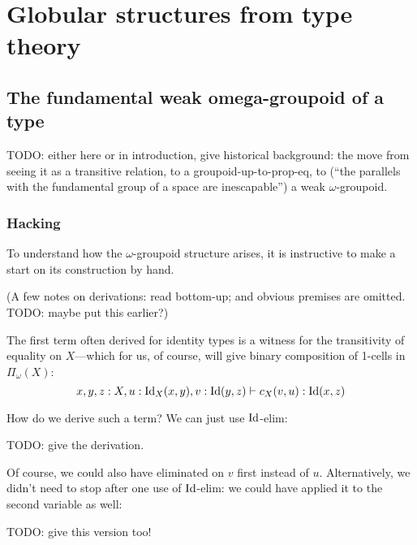 
\chapter{Globular structures from type theory}



\section{The fundamental weak omega-groupoid of a type}


TODO: either here or in introduction, give historical background: the move from seeing it as a transitive relation, to a groupoid-up-to-prop-eq, to (``the parallels with the fundamental group of a space are inescapable'') a weak $\omega$-groupoid.

\subsection*{Hacking} \label{sec:hacking} To understand how the $\omega$-groupoid structure arises, it is instructive to make a start on its construction by hand.

(A few notes on derivations: read bottom-up; and obvious premises are omitted.  TODO: maybe put this earlier?)

The first term often derived for identity types is a witness for the transitivity of equality on $X$---which for us, of course, will give binary composition of 1-cells in $\Pi_\omega(X)$:
$$ x,y,z:X, u:\mathrm{Id}_X(x,y), v:\mathrm{Id}(y,z) \vdash c_X(v,u) : \mathrm{Id}(x,z)$$

How do we derive such a term?  We can just use $\mathrm{Id}$-elim:

TODO: give the derivation.

Of course, we could also have eliminated on $v$ first instead of $u$.  Alternatively, we didn't need to stop after one use of $\mathrm{Id}$-elim: we could have applied it to the second variable as well:

TODO: give this version too!

